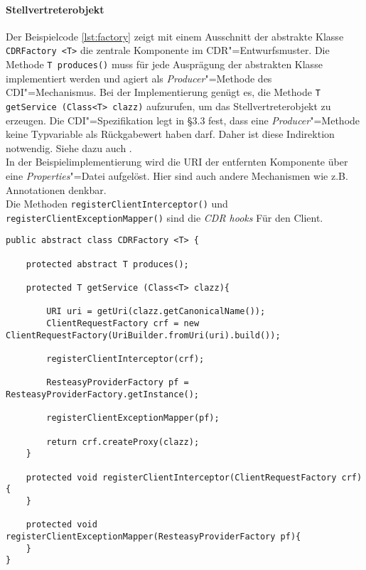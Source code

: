 \paragraph{Stellvertreterobjekt}
Der Beispielcode \ref{lst:factory} zeigt mit einem Ausschnitt der abstrakte Klasse \colorbox{mygray}{\lstinline!CDRFactory <T>!} die zentrale Komponente im \ac{CDR}"=Entwurfsmuster.
Die Methode \colorbox{mygray}{\lstinline!T produces()!} muss für jede Ausprägung der abstrakten Klasse implementiert werden und agiert als \textit{Producer}"=Methode des \ac{CDI}"=Mechanismus. Bei der Implementierung genügt es, die Methode \colorbox{mygray}{\lstinline!T getService (Class<T> clazz)!} aufzurufen, um das Stellvertreterobjekt zu erzeugen. 
Die \ac{CDI}"=Spezifikation legt in §3.3 fest, dass eine \textit{Producer}"=Methode keine Typvariable als Rückgabewert haben darf. Daher ist diese Indirektion notwendig. Siehe dazu auch \cite{group2009jsr299}.\\
In der Beispielimplementierung wird die \ac{URI} der entfernten Komponente über eine \textit{Properties}"=Datei aufgelöst. Hier sind auch andere Mechanismen wie z.B. Annotationen denkbar.\\ 
Die Methoden \colorbox{mygray}{\lstinline!registerClientInterceptor()!} und \colorbox{mygray}{\lstinline!registerClientExceptionMapper()!} sind die \textit{CDR hooks} Für den Client. 
\begin{lstlisting}[caption={Abstrakte CDR"=Fabrik},captionpos=b,label=lst:factory] 
public abstract class CDRFactory <T> {	

	protected abstract T produces();

	protected T getService (Class<T> clazz){							
				
		URI uri = getUri(clazz.getCanonicalName());			
		ClientRequestFactory crf = new ClientRequestFactory(UriBuilder.fromUri(uri).build());	
		
		registerClientInterceptor(crf);	
		
		ResteasyProviderFactory pf = ResteasyProviderFactory.getInstance();
		
		registerClientExceptionMapper(pf);		

		return crf.createProxy(clazz);
	}
	
	protected void registerClientInterceptor(ClientRequestFactory crf){
	}
	
	protected void registerClientExceptionMapper(ResteasyProviderFactory pf){
	}
}
\end{lstlisting}
\newpage
